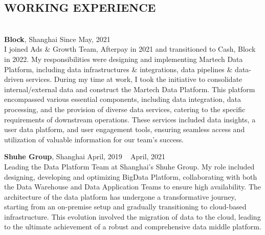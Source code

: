 \documentclass{res}
\begin{document}
\thispagestyle{empty} %

\address{{\bf Address:} 466 Tianbao Road, Shanghai, 200086 \hspace{0.25in}  {\bf Tel:} 18017661124 \hspace{0.25in}  {\bf   Email:} dd.famous@gmail.com}

\begin{resume}
\section{{WORKING EXPERIENCE}}\label{sec:working-experience}
\vspace{-10pt}
\hrulefill\\

\vspace{-20pt}
{\bf Block}, Shanghai \hfill Since May, 2021 \\
I joined Ads \& Growth Team, Afterpay in 2021 and transitioned to Cash, Block in 2022.
My responsibilities were designing and implementing Martech Data Platform,
including data infrastructures \& integrations, data pipelines \& data-driven services.
During my time at work, I took the initiative to consolidate internal/external data and construct the Martech Data Platform.
This platform encompassed various essential components, including data integration, data processing, and the provision of diverse data services, catering to the specific requirements of downstream operations.
These services included data insights, a user data platform, and user engagement tools, ensuring seamless access and utilization of valuable information for our team's success.

\vspace{-15pt}
{\bf Shuhe Group}, Shanghai \hfill April, 2019 ~ April, 2021 \\
Leading the Data Platform Team at Shanghai's Shuhe Group.
My role included designing, developing and optimizing BigData Platform,
collaborating with both the Data Warehouse and Data Application Teams to ensure high availability.
The architecture of the data platform has undergone a transformative journey,
starting from an on-premise setup and gradually transitioning to cloud-based infrastructure.
This evolution involved the migration of data to the cloud, leading to the ultimate achievement of
a robust and comprehensive data middle platform.


\end{resume}
\end{document}
